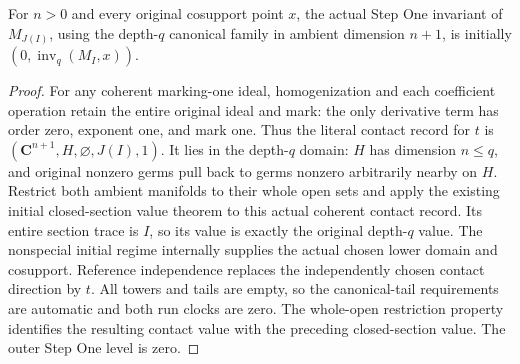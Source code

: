 \begin{lemma}
\label{hir:disjoint-coherent-normal-contact-value}
\leanok
For $n>0$ and every original cosupport point $x$, the actual Step One
invariant of $M_{J(I)}$, using the depth-$q$ canonical family in ambient
dimension $n+1$, is initially $(0,\operatorname{inv}_q(M_I,x))$.
\end{lemma}
\begin{proof}
For any coherent marking-one ideal, homogenization and each coefficient
operation retain the entire original ideal and mark: the only derivative
term has order zero, exponent one, and mark one. Thus the literal contact
record for $t$ is $(\mathbf C^{n+1},H,\varnothing,J(I),1)$. It lies in the
depth-$q$ domain: $H$ has dimension $n\le q$, and original nonzero germs
pull back to germs nonzero arbitrarily nearby on $H$. Restrict both
ambient manifolds to their whole open sets and apply the existing
initial closed-section value theorem to this actual coherent contact
record. Its entire section trace is $I$, so its value is exactly the
original depth-$q$ value. The nonspecial initial regime internally
supplies the actual chosen lower domain and cosupport. Reference
independence replaces the independently chosen contact direction by $t$.
All towers and tails are empty, so the canonical-tail requirements are
automatic and both run clocks are zero. The whole-open restriction
property identifies the resulting contact value with the preceding
closed-section value. The outer Step One level is zero.
\end{proof}


